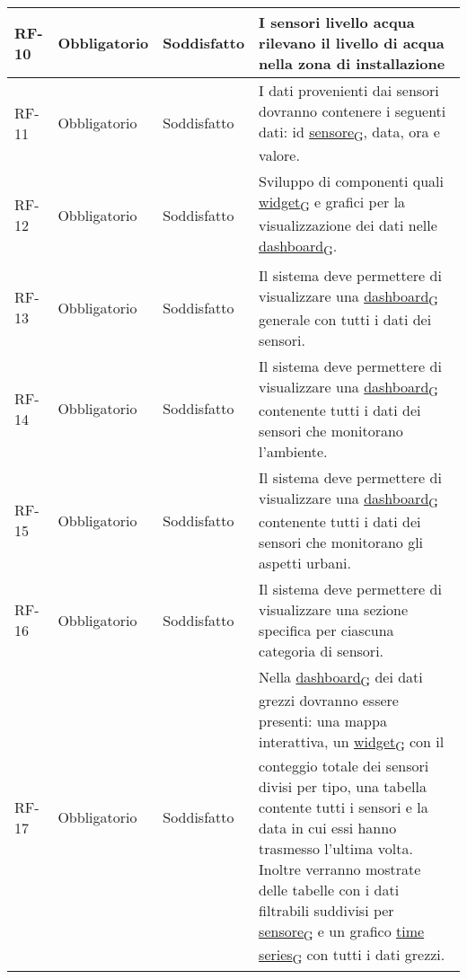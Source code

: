 \begin{longtable}{|>{\centering\arraybackslash}m{}|>{\centering\arraybackslash}m{}|>{\centering\arraybackslash}m{}|>{\centering\arraybackslash}m{}|}
	\\\hline
	RF-10           & Obbligatorio        & Soddisfatto & I sensori livello acqua rilevano il livello di acqua nella zona di installazione
	\\\hline
	RF-11           & Obbligatorio        & Soddisfatto & I dati provenienti dai sensori dovranno contenere i seguenti dati: id \href{https://7last.github.io/docs/pb/documentazione-interna/glossario\#sensore}{sensore\textsubscript{G}}, data, ora e valore.
	\\\hline
	RF-12           & Obbligatorio        & Soddisfatto & Sviluppo di componenti quali \href{https://7last.github.io/docs/pb/documentazione-interna/glossario\#widget}{widget\textsubscript{G}} e grafici per la visualizzazione dei dati nelle \href{https://7last.github.io/docs/pb/documentazione-interna/glossario\#dashboard}{dashboard\textsubscript{G}}.
	\\\hline
	RF-13           & Obbligatorio        & Soddisfatto & Il sistema deve permettere di visualizzare una \href{https://7last.github.io/docs/pb/documentazione-interna/glossario\#dashboard}{dashboard\textsubscript{G}} generale con tutti i dati dei sensori.
	\\\hline
	RF-14           & Obbligatorio        & Soddisfatto & Il sistema deve permettere di visualizzare una \href{https://7last.github.io/docs/pb/documentazione-interna/glossario\#dashboard}{dashboard\textsubscript{G}} contenente tutti i dati dei sensori che monitorano l'ambiente.
	\\\hline
	RF-15           & Obbligatorio        & Soddisfatto & Il sistema deve permettere di visualizzare una \href{https://7last.github.io/docs/pb/documentazione-interna/glossario\#dashboard}{dashboard\textsubscript{G}} contenente tutti i dati dei sensori che monitorano gli aspetti urbani.
	\\\hline
	RF-16           & Obbligatorio        & Soddisfatto & Il sistema deve permettere di visualizzare una sezione specifica per ciascuna categoria di sensori.
	\\\hline
	RF-17           & Obbligatorio        & Soddisfatto & Nella \href{https://7last.github.io/docs/pb/documentazione-interna/glossario\#dashboard}{dashboard\textsubscript{G}} dei dati grezzi dovranno essere presenti: una mappa interattiva, un \href{https://7last.github.io/docs/pb/documentazione-interna/glossario\#widget}{widget\textsubscript{G}} con il conteggio totale dei sensori divisi per tipo, una tabella contente tutti i sensori e la data in cui essi hanno trasmesso l'ultima volta. Inoltre verranno mostrate delle tabelle con i dati filtrabili suddivisi per \href{https://7last.github.io/docs/pb/documentazione-interna/glossario\#sensore}{sensore\textsubscript{G}} e un grafico \href{https://7last.github.io/docs/pb/documentazione-interna/glossario\#time-series}{time series\textsubscript{G}} con tutti i dati grezzi.

\end{longtable}
